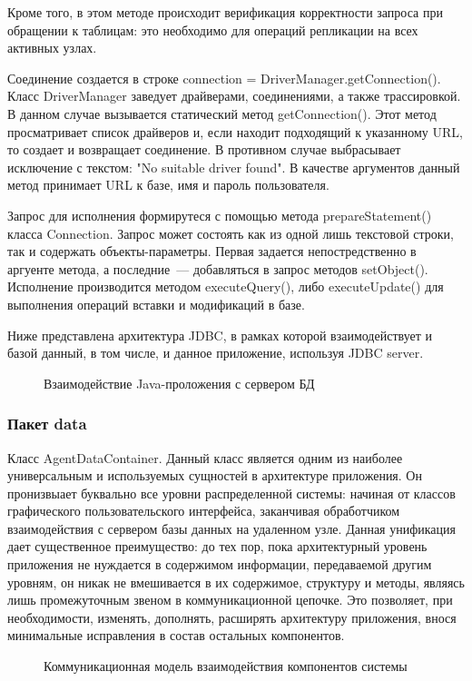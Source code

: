 Кроме того, в этом методе происходит верификация корректности запроса при обращении к таблицам: это необходимо для операций репликации на всех активных узлах.

Соединение создается в строке connection = DriverManager.getConnection(). Класс DriverManager заведует драйверами, соединениями, а также трассировкой. В данном случае вызывается статический метод getConnection(). Этот метод просматривает список драйверов и, если находит подходящий к указанному URL, то создает и возвращает соединение. В противном случае выбрасывает исключение с текстом: "No suitable driver found". В качестве аргументов данный метод принимает URL к базе, имя и пароль пользователя.

Запрос для исполнения формирутеся с помощью метода prepareStatement() класса Connection. Запрос может состоять как из одной лишь текстовой строки, так и содержать объекты-параметры. Первая задается непостредственно в аргуенте метода, а последние~--- добавляться в запрос методов setObject(). Исполнение производится методом executeQuery(), либо executeUpdate() для выполнения операций вставки и модификаций в базе.

Ниже представлена архитектура JDBC, в рамках которой взаимодействует и базой данный, в том числе, и данное приложение, используя JDBC server.
\begin{figure}[h]
\caption{Взаимодействие Java-проложения с сервером БД}
\label{3:jdbc}
\end{figure}

\subsubsection{Пакет data}
Класс AgentDataContainer. Данный класс является одним из наиболее универсальным и используемых сущностей в архитектуре приложения. Он пронизвыает буквально все уровни распределенной системы: начиная от классов графического пользовательского интерфейса, заканчивая обработчиком взаимодействия с сервером базы данных на удаленном узле. Данная унификация дает существенное преимущество: до тех пор, пока архитектурный уровень приложения не нуждается в содержимом информации, передаваемой другим уровням, он никак не вмешивается в их содержимое, структуру и методы, являясь лишь промежуточным звеном в коммуникационной цепочке. Это позволяет, при необходимости, изменять, дополнять, расширять архитектуру приложения, внося минимальные исправления в состав остальных компонентов.
\begin{figure}[h]
\caption{Коммуникационная модель взаимодействия компонентов системы}
\label{3:comm-dia}
\end{figure}

